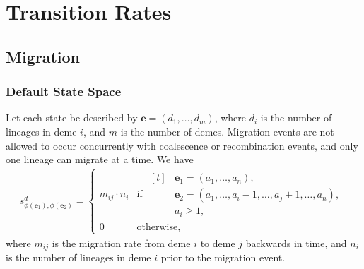 \nolinenumbers

\renewcommand{\thefigure}{\thesection.\arabic{figure}}
\renewcommand{\thetable}{\thesection.\arabic{table}}


\section{Transition Rates}\label{sec:transition_rates}

\subsection{Migration}\label{subsec:migration}

\subsubsection{Default State Space}\label{subsubsec:migration_default}
Let each state be described by $\mathbf{e}=(d_1, \ldots, d_m)$, where $d_i$ is the number of lineages in deme $i$, and $m$ is the number of demes.
Migration events are not allowed to occur concurrently with coalescence or recombination events, and only one lineage can migrate at a time.
We have
\begin{align*}
    s^d_{\phi(\mathbf{e}_1),\phi(\mathbf{e}_2)} =
    \begin{cases}
        m_{ij} \cdot n_i & \text{if }
        \begin{aligned}[t]
            & \mathbf{e}_1=(a_1,\dots,a_n), \\
            & \mathbf{e}_2=(a_1,\dots,a_i-1,\dots,a_j+1,\dots,a_{n}), \\
            & a_i \geq 1,
        \end{aligned} \\
        0 & \text{otherwise,}
    \end{cases}
\end{align*}
where $m_{ij}$ is the migration rate from deme $i$ to deme $j$ backwards in time, and $n_i$ is the number of lineages in deme $i$ prior to the migration event.

